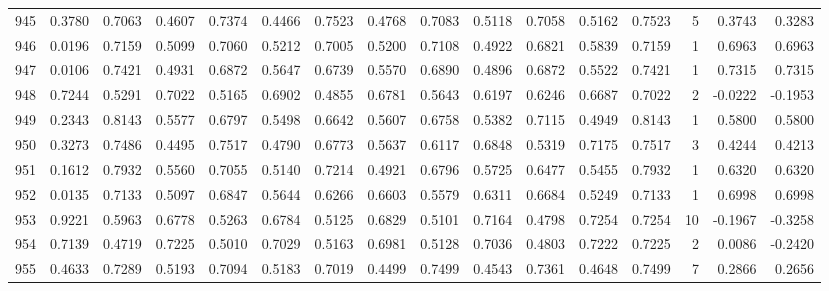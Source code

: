 \begin{tabular}{lrrrrrrrrrrrrrrr}
945 &      0.3780 &  0.7063 &  0.4607 &  0.7374 &  0.4466 &  0.7523 &  0.4768 &  0.7083 &  0.5118 &  0.7058 &   0.5162 &     0.7523 &      5 &                    0.3743 &                     0.3283 \\
946 &      0.0196 &  0.7159 &  0.5099 &  0.7060 &  0.5212 &  0.7005 &  0.5200 &  0.7108 &  0.4922 &  0.6821 &   0.5839 &     0.7159 &      1 &                    0.6963 &                     0.6963 \\
947 &      0.0106 &  0.7421 &  0.4931 &  0.6872 &  0.5647 &  0.6739 &  0.5570 &  0.6890 &  0.4896 &  0.6872 &   0.5522 &     0.7421 &      1 &                    0.7315 &                     0.7315 \\
948 &      0.7244 &  0.5291 &  0.7022 &  0.5165 &  0.6902 &  0.4855 &  0.6781 &  0.5643 &  0.6197 &  0.6246 &   0.6687 &     0.7022 &      2 &                   -0.0222 &                    -0.1953 \\
949 &      0.2343 &  0.8143 &  0.5577 &  0.6797 &  0.5498 &  0.6642 &  0.5607 &  0.6758 &  0.5382 &  0.7115 &   0.4949 &     0.8143 &      1 &                    0.5800 &                     0.5800 \\
950 &      0.3273 &  0.7486 &  0.4495 &  0.7517 &  0.4790 &  0.6773 &  0.5637 &  0.6117 &  0.6848 &  0.5319 &   0.7175 &     0.7517 &      3 &                    0.4244 &                     0.4213 \\
951 &      0.1612 &  0.7932 &  0.5560 &  0.7055 &  0.5140 &  0.7214 &  0.4921 &  0.6796 &  0.5725 &  0.6477 &   0.5455 &     0.7932 &      1 &                    0.6320 &                     0.6320 \\
952 &      0.0135 &  0.7133 &  0.5097 &  0.6847 &  0.5644 &  0.6266 &  0.6603 &  0.5579 &  0.6311 &  0.6684 &   0.5249 &     0.7133 &      1 &                    0.6998 &                     0.6998 \\
953 &      0.9221 &  0.5963 &  0.6778 &  0.5263 &  0.6784 &  0.5125 &  0.6829 &  0.5101 &  0.7164 &  0.4798 &   0.7254 &     0.7254 &     10 &                   -0.1967 &                    -0.3258 \\
954 &      0.7139 &  0.4719 &  0.7225 &  0.5010 &  0.7029 &  0.5163 &  0.6981 &  0.5128 &  0.7036 &  0.4803 &   0.7222 &     0.7225 &      2 &                    0.0086 &                    -0.2420 \\
955 &      0.4633 &  0.7289 &  0.5193 &  0.7094 &  0.5183 &  0.7019 &  0.4499 &  0.7499 &  0.4543 &  0.7361 &   0.4648 &     0.7499 &      7 &                    0.2866 &                     0.2656 \\

\end{tabular}
